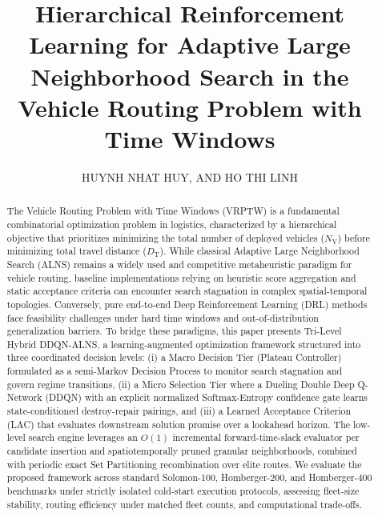 \documentclass{ieeeaccess}
\newcommand{\NV}{{N_\mathrm{V}}}
\newcommand{\TD}{{D_\mathrm{T}}}
\begin{document}

\title{Hierarchical Reinforcement Learning for Adaptive Large Neighborhood Search in the Vehicle Routing Problem with Time Windows}

\author{\uppercase{Huynh Nhat Huy}, \uppercase{and Ho Thi Linh}}

\address[1]{Faculty of Information Technology, Ton Duc Thang University, Ho Chi Minh City, Vietnam (e-mail: huynhnthuy@tdtu.edu.vn)}
\address[2]{Natural Language Processing and Knowledge Discovery Research Group, Faculty of Information Technology, Ton Duc Thang University, Ho Chi Minh City, Vietnam (e-mail: hotlinh@tdtu.edu.vn)}




\titlepgskip=-15pt

\begin{abstract}
The Vehicle Routing Problem with Time Windows (VRPTW) is a fundamental combinatorial optimization problem in logistics, characterized by a hierarchical objective that prioritizes minimizing the total number of deployed vehicles ($\NV$) before minimizing total travel distance ($\TD$). While classical Adaptive Large Neighborhood Search (ALNS) remains a widely used and competitive metaheuristic paradigm for vehicle routing, baseline implementations relying on heuristic score aggregation and static acceptance criteria can encounter search stagnation in complex spatial-temporal topologies. Conversely, pure end-to-end Deep Reinforcement Learning (DRL) methods face feasibility challenges under hard time windows and out-of-distribution generalization barriers. To bridge these paradigms, this paper presents Tri-Level Hybrid DDQN-ALNS, a learning-augmented optimization framework structured into three coordinated decision levels: (i) a Macro Decision Tier (Plateau Controller) formulated as a semi-Markov Decision Process to monitor search stagnation and govern regime transitions, (ii) a Micro Selection Tier where a Dueling Double Deep Q-Network (DDQN) with an explicit normalized Softmax-Entropy confidence gate learns state-conditioned destroy-repair pairings, and (iii) a Learned Acceptance Criterion (LAC) that evaluates downstream solution promise over a lookahead horizon. The low-level search engine leverages an $O(1)$ incremental forward-time-slack evaluator per candidate insertion and spatiotemporally pruned granular neighborhoods, combined with periodic exact Set Partitioning recombination over elite routes. We evaluate the proposed framework across standard Solomon-100, Homberger-200, and Homberger-400 benchmarks under strictly isolated cold-start execution protocols, assessing fleet-size stability, routing efficiency under matched fleet counts, and computational trade-offs.
\end{abstract}
\end{document}
